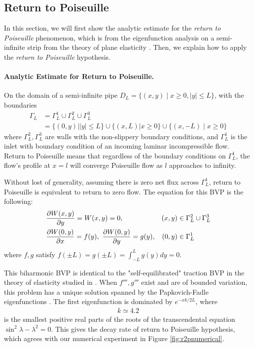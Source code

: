 \documentclass[10pt,twocolumn]{article}
\begin{document}
\subsection{Return to Poiseuille\label{sec:ret2poi}} 

In this section, we will first show the analytic estimate for the \textit{return to Poiseuille} phenomenon,
which is from the eigenfunction analysis on a semi-infinite strip from the theory of plane elasticity 
\cite{gregoryTractionBoundaryValue1980}. 
Then, we explain how to apply the \textit{return to Poiseuille} hypothesis. 

\paragraph*{Analytic Estimate for Return to Poiseuille. }

On the domain of a semi-infinite pipe $D_L = \{(x,y)\mid x \ge 0, |y| \le L\}$, with the boundaries 
\begin{align}
  \Gamma_L &= \Gamma_L^1 \cup \Gamma_L^2 \cup \Gamma_L^3 \\
  &=\{(0,y)||y| \le L \} \cup \{(x,L)|x\ge 0\} \cup \{(x,-L)\mid x\ge 0\}\nonumber
\end{align}
where $\Gamma_L^2,\Gamma_L^3$ are walls with the non-slippery boundary conditions, 
and $\Gamma_L^1$ is the inlet with boundary condition of an
incoming laminar incompressible flow. 
Return to Poiseuille means that regardless of the boundary conditions on $\Gamma_L^1$,
the flow's profile at $x = l$ will converge Poiseuille flow as $l$ approaches to infinity. 

Without lost of generality, assuming there is zero net flux across $\Gamma_L^1$,
return to Poiseuille is equivalent to return to zero flow. The equation for this BVP
is the following:
\begin{align}
  &\pdv{W(x,y)}{y}  = W(x,y) = 0,  &(x,y) &\in \Gamma_L^2 \cup \Gamma_L^3 \\
  &\pdv{W(0,y)}{x}  = f(y),\ \pdv{W(0,y)}{y} = g(y), &(0,y) &\in \Gamma_L^1  \label{eq:velocity-condition-at-inlet}
\end{align}
where $f,g$ satisfy $f(\pm L) = g(\pm L) = \int_{-L}^L g(y)dy = 0$. 

This biharmonic BVP is identical to the "self-equilibrated" traction BVP in the theory of elasticity studied in
\cite{gregoryTractionBoundaryValue1980,horganDECAYESTIMATESBIHARMONIC1989,coRecentDevelopmentsConcerning1983}. 
When $f''',g'''$ exist and are of bounded variation, 
this problem has a unique solution spanned by the Papkovich-Fadle eigenfunctions \cite{gregoryTractionBoundaryValue1980}.
The first eigenfunction is dominated by $e^{-xk/2L}$, where 
\begin{align*}
  k \simeq 4.2 
\end{align*}
is the smallest positive real parts of the roots 
of the transcendental equation $\sin^2\lambda - \lambda^2=0$. 
This gives the decay rate of return to Poiseuille hypothesis, 
which agrees with our numerical experiment in Figure \ref{fig:r2pnumerical}. 
\end{document}
